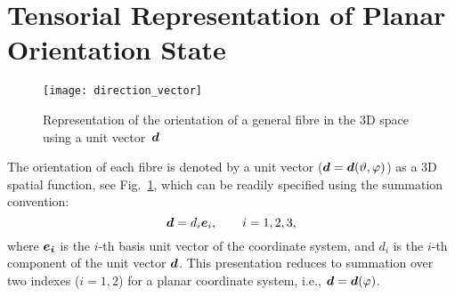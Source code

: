\section{Tensorial Representation of Planar Orientation State}
\begin{figure}[!h]
\centering
%
%
%
%
%
%
%
%
%
%
%
  	\texttt{[image: direction\_vector]}
\caption{Representation of the orientation of a general fibre in the 3D space using a unit vector~$\tena{d}$}\label{fig:vector}
\end{figure}%
	The orientation of each fibre is denoted by a unit vector ($\tena{d}=\tena{d}(\vartheta,\varphi)$) as a 3D spatial function, see Fig.~\ref{fig:vector}, which can be readily specified using the summation convention:
	\begin{equation}
	\tena{d}=d_i\tena{e}_i,\qquad i=1,2,3,
	\end{equation}
	where $\tena{e_i}$ is the $i$-th basis unit vector of the coordinate system, and  $d_i$ is the $i$-th component of the unit vector $\tena{d}$. This presentation reduces to summation over two indexes ($i=1,2$) for a planar coordinate system, i.e., $\tena{d}=\tena{d}(\varphi)$.

